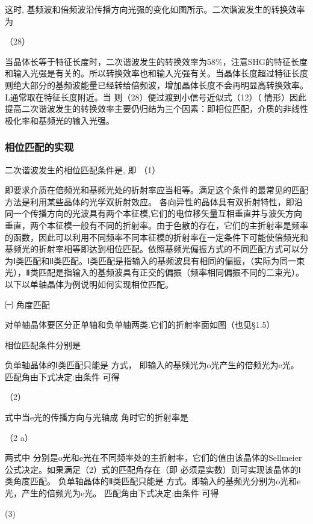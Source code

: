 这时, 基频波和倍频波沿传播方向光强的变化如图所示。二次谐波发生的转换效率为

                                    （28）                        
                                     
当晶体长等于特征长度时，二次谐波发生的转换效率为58\%，注意SHG的特征长度和输入光强是有关的。所以转换效率也和输入光强有关。当晶体长度超过特征长度则绝大部分的基频波能量已经转给倍频波，增加晶体长度不会再明显高转换效率。L通常取在特征长度附近。当 则（28）便过渡到小信号近似式（12）（ 情形）因此提高二次谐波发生的转换效率主要仍归结为三个因素：即相位匹配，介质的非线性极化率和基频光的输入光强。

\subsubsection{相位匹配的实现}
二次谐波发生的相位匹配条件是, 即                     （1）

即要求介质在倍频光和基频光处的折射率应当相等。满足这个条件的最常见的匹配方法是利用某些晶体的光学双折射效应。 各向异性的晶体具有双折射特性，即沿同一个传播方向的光波具有两个本征模,它们的电位移矢量互相垂直并与波矢方向垂直，两个本征模一般有不同的折射率。由于色散的存在，它们的主折射率是频率的函数，因此可以利用不同频率不同本征模的折射率在一定条件下可能使倍频光和基频光的折射率相等即达到相位匹配。依照基频光偏振方式的不同匹配方式可以分为Ⅰ类匹配和Ⅱ类匹配。Ⅰ类匹配是指输入的基频波具有相同的偏振，（实际为同一束光），Ⅱ类匹配是指输入的基频波具有正交的偏振（频率相同偏振不同的二束光）。以下以单轴晶体为例说明如何实现相位匹配。

  ㈠ 角度匹配

对单轴晶体要区分正单轴和负单轴两类.它们的折射率面如图（也见§1.5）

       
 相位匹配条件分别是

负单轴晶体的Ⅰ类匹配只能是 方式， 即输入的基频光为o光产生的倍频光为e光。 匹配角由下式决定:由条件 可得

                                        （2）

式中当e光的传播方向与光轴成 角时它的折射率是

                     （2 a）
                     
两式中 分别是o光和e光在不同频率处的主折射率，它们的值由该晶体的Sellmeier公式决定。如果满足（2）式的匹配角存在（即 必须是实数）则可实现该晶体的Ⅰ类角度匹配。
负单轴晶体的Ⅱ类匹配只能是 方式。即输入的基频光分别为o光和e光，产生的倍频光为e光。  匹配角由下式决定:由条件  可得

                                              (3)

